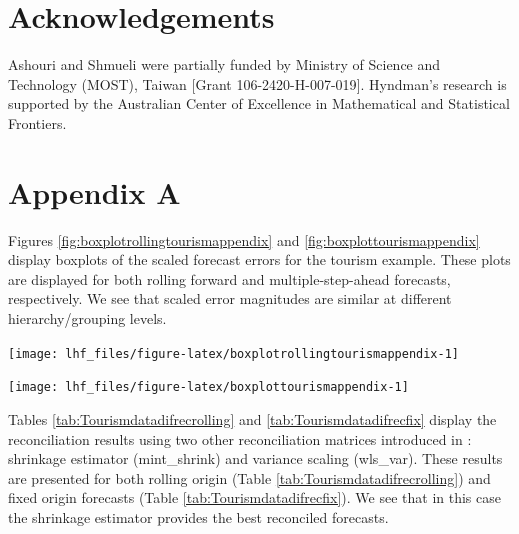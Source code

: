 \documentclass[11pt,a4paper,]{article}
\let\origfigure\figure
\let\endorigfigure\endfigure
\renewenvironment{figure}[1][2] {
    \expandafter\origfigure\expandafter[!htbp]
} {
    \endorigfigure
}
\begin{document}
\hypertarget{acknowledgements}{%
\section*{Acknowledgements}\label{acknowledgements}}

Ashouri and Shmueli were partially funded by Ministry of Science and Technology (MOST), Taiwan {[}Grant 106-2420-H-007-019{]}. Hyndman's research is supported by the Australian Center of Excellence in Mathematical and Statistical Frontiers.

\clearpage

\hypertarget{appendix-appendix}{%
\appendix}


\hypertarget{appendix-a}{%
\section{Appendix A}\label{appendix-a}}

Figures \ref{fig:boxplotrollingtourismappendix} and \ref{fig:boxplottourismappendix} display boxplots of the scaled forecast errors for the tourism example. These plots are displayed for both rolling forward and multiple-step-ahead forecasts, respectively. We see that scaled error magnitudes are similar at different hierarchy/grouping levels.

\begin{figure}

{\centering \texttt{[image: lhf\_files/figure-latex/boxplotrollingtourismappendix-1]} 

}

\caption{Box plots of scaled forecast errors from reconciled and unreconciled ETS, ARIMA, and OLS rolling origin forecasts for tourism demand data. Panels are different hierarchy levels.}\label{fig:boxplotrollingtourismappendix}
\end{figure}

\begin{figure}

{\centering \texttt{[image: lhf\_files/figure-latex/boxplottourismappendix-1]} 

}

\caption{Box plots of scaled forecast errors from reconciled and unreconciled ETS, ARIMA, and OLS fixed origin forecasts for tourism demand data. Panels are different hierarchy levels.}\label{fig:boxplottourismappendix}
\end{figure}

Tables \ref{tab:Tourismdatadifrecrolling} and \ref{tab:Tourismdatadifrecfix} display the reconciliation results using two other reconciliation matrices introduced in \autocite{mint2018}: shrinkage estimator (mint\_shrink) and variance scaling (wls\_var). These results are presented for both rolling origin (Table \ref{tab:Tourismdatadifrecrolling}) and fixed origin forecasts (Table \ref{tab:Tourismdatadifrecfix}). We see that in this case the shrinkage estimator provides the best reconciled forecasts.
\end{document}

